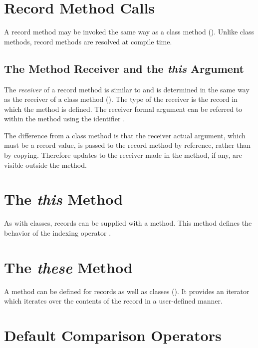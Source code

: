 \section{Record Method Calls}
\label{Record_Method_Access}

A record method may be invoked the same way as a class method
().  Unlike class methods, record methods are
resolved at compile time.  

\subsection{The Method Receiver and the {\em this} Argument}
\label{The_this_Reference}

The \emph{receiver} of a record method is similar to and is determined in the
same way as the receiver of a class method ().
The type of the receiver is the record in which the method is defined.
The receiver formal argument can be referred to within the method
using the identifier .

The difference from a class method is that the receiver actual argument,
which must be a record value, is passed to the record method by reference,
rather than by copying. Therefore updates to the receiver made in the
method, if any, are visible outside the method.

\section{The {\em this} Method}

As with classes, records can be supplied with a  method.  This method
defines the behavior of the indexing operator \chpl{[]}.

\section{The {\em these} Method}

A  method can be defined for records as well as classes ().  It
provides an iterator which iterates over the contents of the record in a
user-defined manner.

\section{Default Comparison Operators}
\label{Record_Comparison_Operators}

